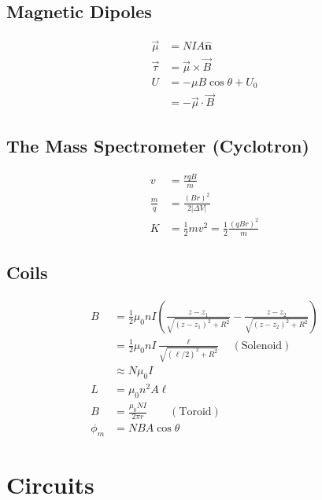 \documentclass[10pt]{article}
\newcommand{\buvec}[1]{\hat{\mathbf{#1}}}
\begin{document}
\begin{multicols*}{5}
\subsection{Magnetic Dipoles}

\begin{align*}
    \vec{\mu} &= NIA \buvec{n}\\
    \vec{\tau} &= \vec{\mu} \times \vec{B}\\
    U &= -\mu B \cos \theta + U_0\\
      &= -\vec{\mu} \cdot \vec{B}
\end{align*}

\subsection{The Mass Spectrometer (Cyclotron)}

\begin{align*}
    v &= \frac{rqB}{m}\\
    \frac{m}{q} &= \frac{(Br)^2}{2 |\Delta V|}\\
    K &= \frac{1}{2} m v^2 = \frac{1}{2}
    \frac{\left({qBr}\right)^2}{m}
\end{align*}

\subsection{Coils}

\begin{align*}
    B &= \frac{1}{2} \mu_0 nI \left({\frac{z-z_1}{\sqrt{(z-z_1)^2 +
	    R^2}} - \frac{z-z_2}{\sqrt{(z-z_2)^2 + R^2}}}\right)\\
      &= \frac{1}{2} \mu_0 nI \frac{\ell}{\sqrt{(\ell/2)^2 + R^2}}
	  \quad (\text{Solenoid})\\
      &\approx N\mu_0 I\\
    L &= \mu_0 n^2 A \ell\\
    B &= \frac{\mu_0NI}{2\pi r} \qquad (\text{Toroid})\\
    \phi_m &= NBA \cos \theta
\end{align*}

\section{Circuits}


\end{multicols*}
\end{document}
